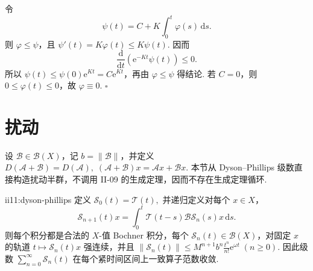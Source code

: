 \begin{FAProof}
令
\[
\psi(t)
=
C+K\int_0^t\varphi(s)\,\mathrm{d}s.
\]
则 \(\displaystyle\varphi\leqslant\psi\)，且 \(\displaystyle\psi'(t)=K\varphi(t)\leqslant K\psi(t)\). 因而
\[
\frac{\mathrm{d}}{\mathrm{d}t}
\left(
\mathrm{e}^{-Kt}\psi(t)
\right)
\leqslant0.
\]
所以 \(\displaystyle\psi(t)\leqslant\psi(0)\mathrm{e}^{Kt}=C\mathrm{e}^{Kt}\)，再由 \(\displaystyle\varphi\leqslant\psi\) 得结论. 若 \(\displaystyle C=0\)，则 \(\displaystyle0\leqslant\varphi(t)\leqslant0\)，故 \(\displaystyle\varphi\equiv0\).
\hfill\(\square\)
\end{FAProof}

\section{扰动}\label{sec:ii11-perturbation}

设 \(\displaystyle\mathcal B\in\mathcal B(X)\)，记 \(\displaystyle b=\|\mathcal B\|\)，并定义 \(\displaystyle D(\mathcal A+\mathcal B)=D(\mathcal A), \; (\mathcal A+\mathcal B)x=\mathcal Ax+\mathcal Bx.\)
本节从 Dyson--Phillips 级数直接构造扰动半群，不调用 II-09 的生成定理，因而不存在生成定理循环.

\begin{FAProposition}{ii11:dyson-phillips}
定义 \(\displaystyle \mathcal S_0(t)=\mathcal T(t),\)
并递归定义对每个 \(\displaystyle x\in X\)，
\[
\mathcal S_{n+1}(t)x
=
\int_0^t
\mathcal T(t-s)\mathcal B\mathcal S_n(s)x
\,\mathrm{d}s.
\]
则每个积分都是合法的 \(\displaystyle X\)-值 Bochner 积分，每个 \(\displaystyle\mathcal S_n(t)\in\mathcal B(X)\)，对固定 \(\displaystyle x\) 的轨道 \(\displaystyle t\mapsto\mathcal S_n(t)x\) 强连续，并且 \(\displaystyle \|\mathcal S_n(t)\| \leqslant M^{n+1}b^n\frac{t^n}{n!}\mathrm{e}^{\omega t} \; (n\geqslant0).\)
因此级数 \(\displaystyle\sum_{n=0}^{\infty}\mathcal S_n(t)\) 在每个紧时间区间上一致算子范数收敛.
\end{FAProposition}

